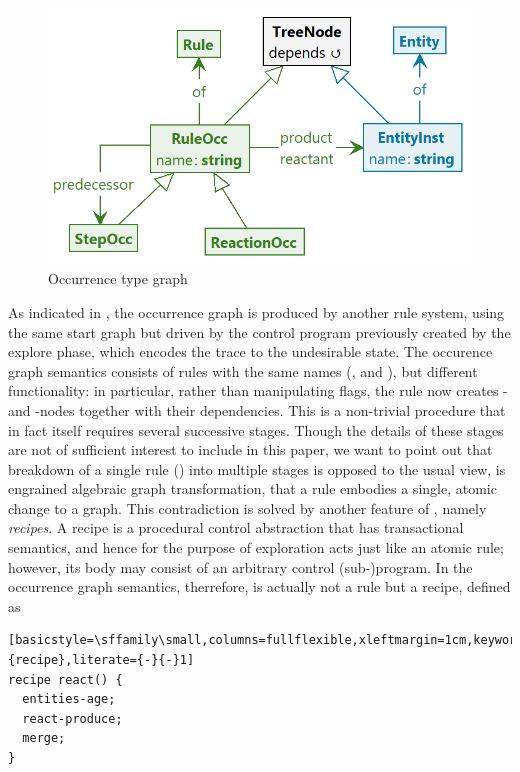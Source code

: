 \begin{figure}
\centering
\includegraphics[scale=.2]{figs/occur-type}
\caption{Occurrence type graph}
\label{fig:occur-type}
\end{figure}

As indicated in , the occurrence graph is produced by another \GROOVE rule system, using the same start graph but driven by the control program previously created by the explore phase, which encodes the trace to the undesirable state. The occurence graph semantics consists of rules with the same names (\reactR, \contextR and \firedR), but different functionality: in particular, rather than manipulating \present flags, the \reactR rule now creates \RuleOcc- and \EntityInst-nodes together with their dependencies. This is a non-trivial procedure that in fact itself requires several successive stages. Though the details of these stages are not of sufficient interest to include in this paper, we want to point out that breakdown of a single rule (\reactR) into multiple stages is opposed to the usual view, is engrained algebraic graph transformation, that a rule embodies a single, atomic change to a graph. This contradiction is solved by another feature of \GROOVE, namely \emph{recipes}. A recipe is a procedural control abstraction that has transactional semantics, and hence for the purpose of exploration acts just like an atomic rule; however, its body may consist of an arbitrary control (sub-)program. In the occurrence graph semantics, therrefore, \reactR is actually not a rule but a recipe, defined as

\begin{center}
\begin{lstlisting}[basicstyle=\sffamily\small,columns=fullflexible,xleftmargin=1cm,keywords={recipe},literate={-}{-}1]
recipe react() {
  entities-age;
  react-produce;
  merge;
}
\end{lstlisting}
\end{center}
%

